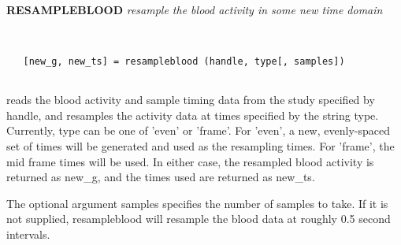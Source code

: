 
{\large\bf RESAMPLEBLOOD} {\em  resample the blood activity in some new time domain}
\begin{verbatim}


   [new_g, new_ts] = resampleblood (handle, type[, samples])


\end{verbatim}

   reads the blood activity and sample timing data from the study
   specified by handle, and resamples the activity data at times
   specified by the string type.  Currently, type can be one of 'even'
   or 'frame'.  For 'even', a new, evenly-spaced set of times will be
   generated and used as the resampling times.  For 'frame', the mid
   frame times will be used.  In either case, the resampled blood
   activity is returned as new\_g, and the times used are returned as
   new\_ts.
 
   The optional argument samples specifies the number of samples
   to take.  If it is not supplied, resampleblood will resample the
   blood data at roughly 0.5 second intervals.
\newpage













